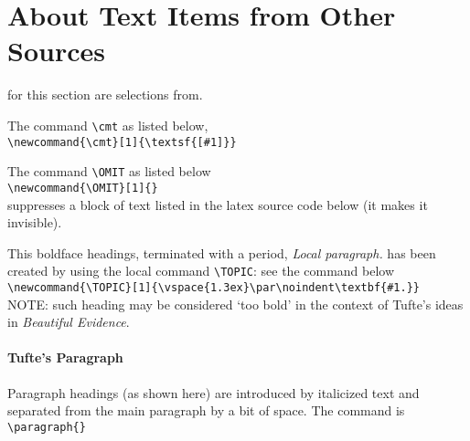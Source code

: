 %
%
%
%
\section{About Text Items from Other Sources}
\label{chap-About-Other}

 for this section are selections
from\cite[-1ex]{Lib-OPUS2-labs-2015-arxiv-Boskovic}.

\vspace*{1.5ex}\noindent
The command \verb+\cmt+ as listed below,
\\  
\verb+\newcommand{\cmt}[1]{\textsf{[#1]}}+

\vspace*{1.5ex}\noindent
The command \verb+\OMIT+ as listed below\\
\verb+\newcommand{\OMIT}[1]{}+ \\
suppresses a block of text listed in the latex source code below
(it makes it invisible).

This boldface headings, terminated with a period, {\em Local paragraph.} has been created by using 
the local command \verb+\TOPIC+: see the command below\\
\verb+\newcommand{\TOPIC}[1]{\vspace{1.3ex}\par\noindent\textbf{#1.}}+\\
\noindent
NOTE: such heading may be considered `too bold' in the context of Tufte's ideas in
{\em Beautiful Evidence}.

\paragraph{Tufte's Paragraph} Paragraph headings (as shown here) are introduced by
italicized text and separated from the main paragraph by a bit of space.
The command is \\
\verb+\paragraph{}+


